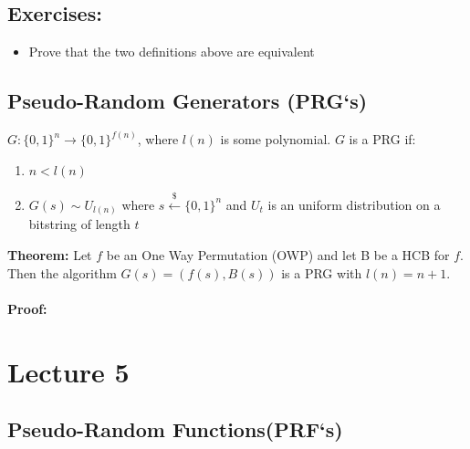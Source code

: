\documentclass[oneside,a4paper,12pt]{book}
\begin{document}
\section{Exercises:}
\begin{itemize}
\item Prove that the two definitions above are equivalent
\end{itemize}
\newpage
\section{Pseudo-Random Generators (PRG`s)}

$G:\{0,1\}^n\rightarrow\{0,1\}^{f(n)}$, where $l(n)$ is some polynomial.
$G$ is a PRG if:
\begin{enumerate}
\item$n<l(n)$
\item $G(s) \sim U_{l(n)}$ where $s\xleftarrow{\$}\{0,1\}^n$ and $U_t$ is an uniform distribution on a bitstring of length $t$
\end{enumerate}
\textbf{Theorem:} Let $f$ be an One Way Permutation (OWP) and let B be a HCB for $f$.
Then the algorithm $G(s)=(f(s),B(s))$ is a PRG with $l(n)=n+1$.\\\\
\textbf{Proof:}
\chapter{Lecture 5}%
\section{Pseudo-Random Functions(PRF`s)}

\end{document}
